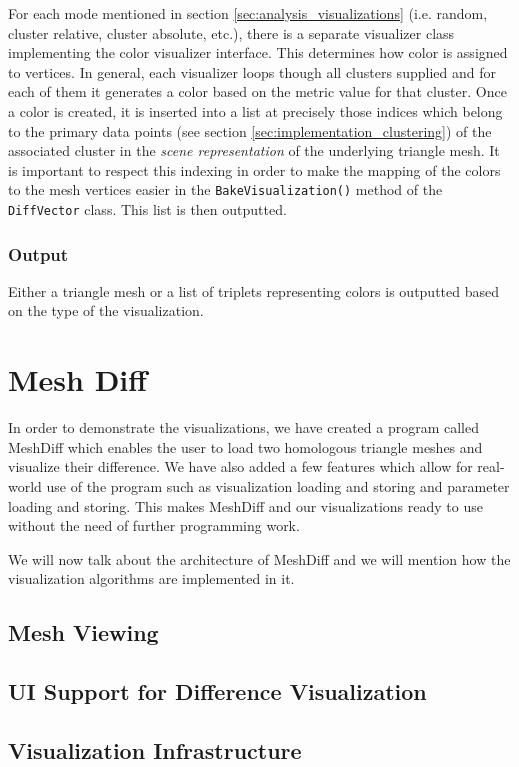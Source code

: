 For each mode mentioned in section \ref{sec:analysis_visualizations} (i.e. random, cluster relative, cluster absolute, etc.), there is a separate visualizer class implementing the color visualizer interface. This determines how color is assigned to vertices. In general, each visualizer loops though all clusters supplied and for each of them it generates a color based on the metric value for that cluster. Once a color is created, it is inserted into a list at precisely those indices which belong to the primary data points (see section \ref{sec:implementation_clustering}) of the associated cluster in the {\it scene representation} of the underlying triangle mesh. It is important to respect this indexing in order to make the mapping of the colors to the mesh vertices easier in the \verb+BakeVisualization()+ method of the \verb+DiffVector+ class. This list is then outputted.

\subsubsection{Output}

Either a triangle mesh or a list of triplets representing colors is outputted based on the type of the visualization.
\section{Mesh Diff}

In order to demonstrate the visualizations, we have created a program called MeshDiff which enables the user to load two homologous triangle meshes and visualize their difference. We have also added a few features which allow for real-world use of the program such as visualization loading and storing and parameter loading and storing. This makes MeshDiff and our visualizations ready to use without the need of further programming work.

We will now talk about the architecture of MeshDiff and we will mention how the visualization algorithms are implemented in it.

\subsection{Mesh Viewing}

\subsection{UI Support for Difference Visualization}

\subsection{Visualization Infrastructure}
